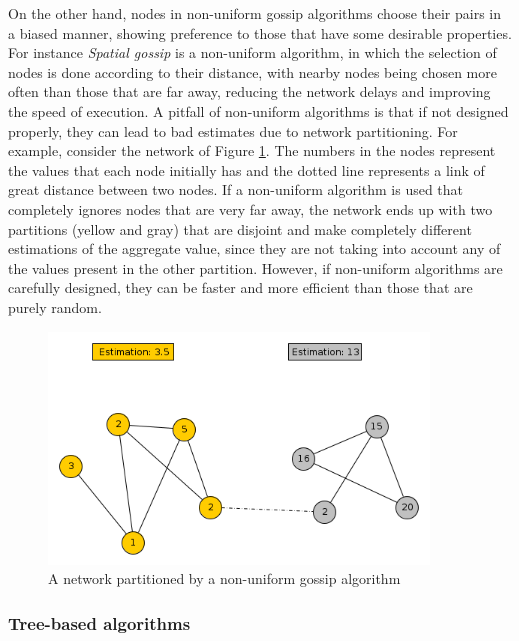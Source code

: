 \documentclass[a4paper,11pt,twoside]{report}
\begin{document}
On the other hand, nodes in non-uniform gossip algorithms choose their pairs in a biased manner, showing preference to those that have some desirable properties. For instance \textit{Spatial gossip} \cite{Kempe:2004:SGR:1039488.1039491} \cite{Rabbat:2007:SGA:1524876.1525177} is a non-uniform algorithm, in which the selection of nodes is done according to their distance, with nearby nodes being chosen more often than those that are far away, reducing the network delays and improving the speed of execution. A pitfall of non-uniform algorithms is that if not designed properly, they can lead to bad estimates due to network partitioning. For example, consider the network of Figure \ref{fig:non_uniform}. The numbers in the nodes represent the values that each node initially has and the dotted line represents a link of great distance between two nodes. If a non-uniform algorithm is used that completely ignores nodes that are very far away, the network ends up with two partitions (yellow and gray) that are disjoint and make completely different estimations of the aggregate value, since they are not taking into account any of the values present in the other partition. However, if non-uniform algorithms are carefully designed, they can be faster and more efficient than those that are purely random. 

\begin{figure}[h]
\centering
\includegraphics[width=0.9\textwidth]{../figures/non-uniform.png}
\caption{A network partitioned by a non-uniform gossip algorithm}
\label{fig:non_uniform}
\end{figure}




\subsubsection*{Tree-based algorithms}
\end{document}
